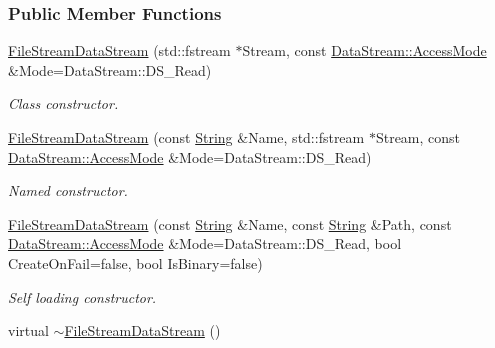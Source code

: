 \subsubsection*{Public Member Functions}
\begin{DoxyCompactItemize}
\item 
\hyperlink{classMezzanine_1_1Resource_1_1FileStreamDataStream_acc64bd469c3c99866d0de6ac5ec31cb9}{FileStreamDataStream} (std::fstream $\ast$Stream, const \hyperlink{classMezzanine_1_1Resource_1_1DataStream_afe2916e4ed8c06130d032d99c5a532f2}{DataStream::AccessMode} \&Mode=DataStream::DS\_\-Read)
\begin{DoxyCompactList}\small\item\em Class constructor. \item\end{DoxyCompactList}\item 
\hyperlink{classMezzanine_1_1Resource_1_1FileStreamDataStream_a5976721377814e456693c2289303c874}{FileStreamDataStream} (const \hyperlink{namespaceMezzanine_acf9fcc130e6ebf08e3d8491aebcf1c86}{String} \&Name, std::fstream $\ast$Stream, const \hyperlink{classMezzanine_1_1Resource_1_1DataStream_afe2916e4ed8c06130d032d99c5a532f2}{DataStream::AccessMode} \&Mode=DataStream::DS\_\-Read)
\begin{DoxyCompactList}\small\item\em Named constructor. \item\end{DoxyCompactList}\item 
\hyperlink{classMezzanine_1_1Resource_1_1FileStreamDataStream_ac000582b45359ff0013dccea8ec3a830}{FileStreamDataStream} (const \hyperlink{namespaceMezzanine_acf9fcc130e6ebf08e3d8491aebcf1c86}{String} \&Name, const \hyperlink{namespaceMezzanine_acf9fcc130e6ebf08e3d8491aebcf1c86}{String} \&Path, const \hyperlink{classMezzanine_1_1Resource_1_1DataStream_afe2916e4ed8c06130d032d99c5a532f2}{DataStream::AccessMode} \&Mode=DataStream::DS\_\-Read, bool CreateOnFail=false, bool IsBinary=false)
\begin{DoxyCompactList}\small\item\em Self loading constructor. \item\end{DoxyCompactList}\item 
\hypertarget{classMezzanine_1_1Resource_1_1FileStreamDataStream_ab77dc3c29f252cda5f914de6ea006179}{
virtual \hyperlink{classMezzanine_1_1Resource_1_1FileStreamDataStream_ab77dc3c29f252cda5f914de6ea006179}{$\sim$FileStreamDataStream} ()}
\label{classMezzanine_1_1Resource_1_1FileStreamDataStream_ab77dc3c29f252cda5f914de6ea006179}


\end{DoxyCompactItemize}
